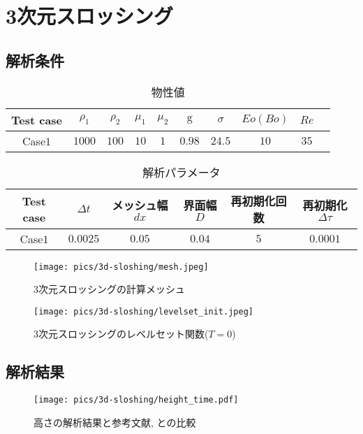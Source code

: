\newpage
\section{3次元スロッシング}

\subsection{解析条件}

\renewcommand{\arraystretch}{1}
\begin{table}[H]
	\centering
	\caption{物性値}
	\begin{tabular}{cccccccccc}
		\hline
		Test case & $\rho_1$ & $\rho_2$ & $\mu_1$ & $\mu_2$ & $\mathrm{g}$ & $\sigma$ & $Eo (Bo)$ & $Re$ \\
		\hline 
		Case$1$ & $1000$ & $100$ & $10$ & $1$   & $0.98$ & $24.5$ & $10$ & $35$\\
		\hline         
	\end{tabular}
	\label{table:3d-bubble-material-property}
\end{table}
\renewcommand{\arraystretch}{1.0}

\renewcommand{\arraystretch}{1}
\begin{table}[H]
	\centering
	\caption{解析パラメータ}
	\begin{tabular}{cccccc}
		\hline
		Test case & $\Delta t$ & メッシュ幅$dx$ & 界面幅$D$ & 再初期化回数 & 再初期化$\Delta \tau$\\
		\hline 
		Case$1$ & $0.0025$ & $0.05$ & $0.04$ & $5$ & $0.0001$\\
		\hline         
	\end{tabular}
	\label{table:3d-bubble-parameter}
\end{table}
\renewcommand{\arraystretch}{1.0}

\begin{figure}[H]
	\centering
	\begin{minipage}[b]{0.49\columnwidth}
	    \centering
	    \texttt{[image: pics/3d-sloshing/mesh.jpeg]}
		\caption{3次元スロッシングの計算メッシュ}
		\label{fig:3d-sloshing-mesh}
	\end{minipage}
	\begin{minipage}[b]{0.49\columnwidth}
	    \centering
	    \texttt{[image: pics/3d-sloshing/levelset\_init.jpeg]}
		\caption{3次元スロッシングのレベルセット関数($T=0$)}
		\label{fig:3d-sloshing-levelset_t0_3d}
	\end{minipage}
\end{figure}

\subsection{解析結果}

\begin{figure}[H]
    \centering
	\texttt{[image: pics/3d-sloshing/height\_time.pdf]}
	\caption{高さの解析結果と参考文献\cite{Okamoto1992}, \cite{Sakuraba2001}との比較}
	\label{fig:3d-sloshing-result}
\end{figure}